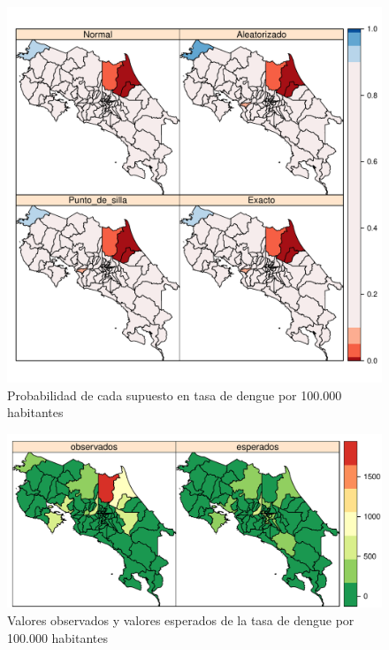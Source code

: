 \documentclass[12pt,a4paper]{article}
\begin{document}
\newpage
\begin{figure}[hbtp]
\centering
\includegraphics[scale=0.75]{FA7.pdf}
\caption{Probabilidad de cada supuesto en tasa de dengue por 100.000 habitantes}
\end{figure}
\newpage
\begin{figure}[hbtp]
\centering
\includegraphics[scale=0.75]{FA8.pdf}
\caption{Valores observados y valores esperados de la tasa de dengue por 100.000 habitantes}
\end{figure}
\end{document}

